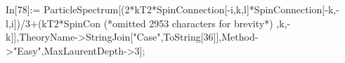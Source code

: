 In[78]:= ParticleSpectrum[(2*kT2*SpinConnection[-i,k,l]*SpinConnection[-k,-l,i])/3+(kT2*SpinCon (*omitted 2953 characters for brevity*) ,k,-k]],TheoryName->StringJoin["Case",ToString[36]],Method->"Easy",MaxLaurentDepth->3];
